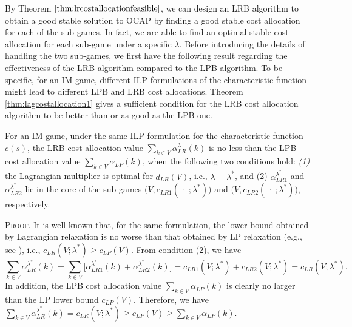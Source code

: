 \documentclass[ijoc,nonblindrev]{informs3} %
\begin{document}
By Theorem $\ref{thm:lrcostallocationfeasible}$, we can design an LRB algorithm to obtain a good stable solution to OCAP by finding a good stable cost allocation for each of the sub-games. In fact, we are able to  find an optimal stable cost allocation for each sub-game under a specific $\lambda$. 
Before introducing the details of handling the two sub-games, we first have the following result regarding the effectiveness of the LRB algorithm compared to the LPB algorithm. To be specific, for an IM game, different ILP formulations of the characteristic function might lead to different LPB and LRB cost allocations. Theorem \ref{thm:lagcostallocation1} gives a sufficient condition for the LRB cost allocation algorithm to be better than or as good as the LPB one.  %
\begin{theorem}\label{thm:lagcostallocation1}
For an IM game, under the same ILP formulation for the characteristic function $c(s)$, the LRB cost allocation value $\sum_{k \in V}\alpha_{LR}^{\lambda}(k)$ is no less than the LPB cost allocation value $\sum_{k \in V}\alpha_{LP}(k)$, when the following two conditions hold: {\em (1)} the Lagrangian multiplier is optimal for $d_{LR}(V)$, i.e., $\lambda = \lambda^*$, and  {\rm  (2)} $\alpha_{LR1}^{\lambda^*}$  and $\alpha_{LR2}^{\lambda^*}$  lie in the core of the sub-games $\big(V,c_{LR1}(\ \cdot\ ;\lambda^*)\big)$ and $\big(V,c_{LR2}(\ \cdot\ ;\lambda^*)\big)$, respectively.
\end{theorem}
{\scshape Proof.}
It is well known that, for the same formulation, the lower bound obtained by Lagrangian relaxation is no worse than that obtained by LP relaxation (e.g., see \citealt{Ahuja1993NetworkBook}), i.e., $c_{LR}(V;\lambda^*) \geq c_{LP}(V)$. From condition (2), we have $$\sum_{k \in V} \alpha_{LR}^{\lambda^*}(k) = \sum_{k \in V} \big[\alpha_{LR1}^{\lambda^*}(k) + \alpha_{LR2}^{\lambda^*}(k)\big] = c_{LR1}(V;\lambda^*) + c_{LR2}(V;\lambda^*) = c_{LR}(V;\lambda^*).$$ 
In addition, the LPB cost allocation value $\sum_{k \in V}\alpha_{LP}(k)$ is clearly no larger than the LP lower bound $c_{LP}(V)$. Therefore, we have $\sum_{k \in V} \alpha_{LR}^{\lambda^*}(k) = c_{LR}(V;\lambda^*) \geq c_{LP}(V) \geq \sum_{k \in V}\alpha_{LP}(k)$.
\hfill\Halmos
\end{document}
